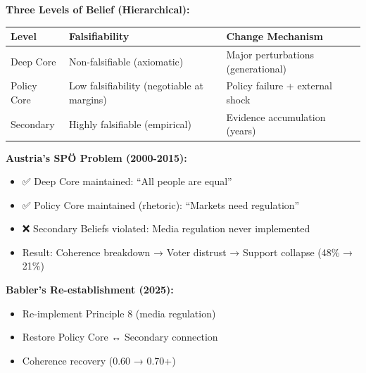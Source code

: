 \begin{tcolorbox}[colback=yellow!5!white, colframe=yellow!75!black,
    title=Quick Reference: Sabatier ACF Structure]

\textbf{Three Levels of Belief (Hierarchical):}

\begin{table}[h]
\centering
\small
\renewcommand{\arraystretch}{1.3}
\begin{tabular}{@{}llp{5cm}@{}}
\toprule
\textbf{Level} & \textbf{Falsifiability} & \textbf{Change Mechanism} \\
\midrule
Deep Core & Non-falsifiable (axiomatic) & Major perturbations (generational) \\
Policy Core & Low falsifiability (negotiable at margins) & Policy failure + external shock \\
Secondary & Highly falsifiable (empirical) & Evidence accumulation (years) \\
\bottomrule
\end{tabular}
\end{table}

\textbf{Austria's SPÖ Problem (2000-2015):}
\begin{itemize}[nosep]
\item ✅ Deep Core maintained: ``All people are equal''
\item ✅ Policy Core maintained (rhetoric): ``Markets need regulation''
\item ❌ Secondary Beliefs violated: Media regulation never implemented
\item Result: Coherence breakdown → Voter distrust → Support collapse (48\% → 21\%)
\end{itemize}

\textbf{Babler's Re-establishment (2025):}
\begin{itemize}[nosep]
\item Re-implement Principle 8 (media regulation)
\item Restore Policy Core ↔ Secondary connection
\item Coherence recovery (0.60 → 0.70+)
\end{itemize}

\end{tcolorbox}



